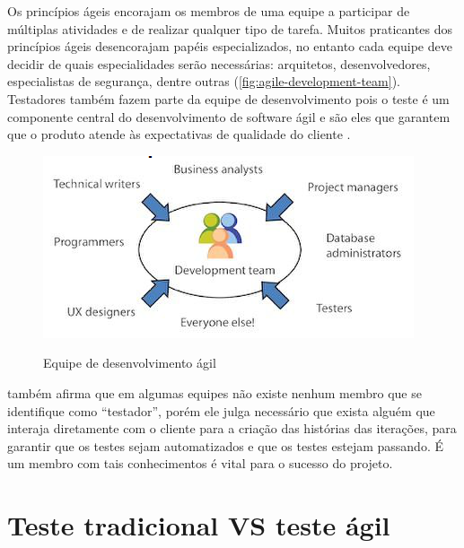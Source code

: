 \documentclass[
	12pt,				%
	openright,			%
	oneside,			%
	a4paper,			%
	english,			%
	brazil,				%
	]{abntex2}
\begin{document}
Os princípios ágeis encorajam os membros de uma equipe a participar de múltiplas atividades e de realizar qualquer tipo de tarefa. Muitos praticantes dos princípios ágeis desencorajam papéis especializados, no entanto cada equipe deve decidir de quais especialidades serão necessárias: arquitetos, desenvolvedores, especialistas de segurança, dentre outras (\autoref{fig:agile-development-team}). Testadores também fazem parte da equipe de desenvolvimento pois o teste é um componente central do desenvolvimento de software ágil e são eles que garantem que o produto atende às expectativas de qualidade do cliente \cite{crispin2009}.

\begin{figure}[H]
    \centering
    \caption{Equipe de desenvolvimento ágil}
    \graphicspath{ {./graphics/agile/} }
    \includegraphics[scale=1.0]{agile-development-team}
    \label{fig:agile-development-team}
\end{figure}

 também afirma que em algumas equipes não existe nenhum membro que se identifique como ``testador'', porém ele julga necessário que exista alguém que interaja diretamente com o cliente para a criação das histórias das iterações, para garantir que os testes sejam automatizados e que os testes estejam passando. É um membro com tais conhecimentos é vital para o sucesso do projeto.

\section{Teste tradicional VS teste ágil}
\end{document}
